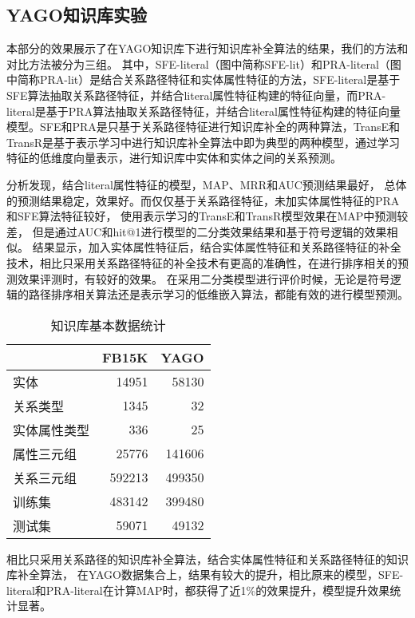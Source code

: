 \subsection{YAGO知识库实验}
\label{cha:exp-literal}
本部分的效果展示了在YAGO知识库下进行知识库补全算法的结果，我们的方法和对比方法被分为三组。
其中，SFE-literal（图中简称SFE-lit）和PRA-literal（图中简称PRA-lit）是结合关系路径特征和实体属性特征的方法，SFE-literal是基于SFE算法抽取关系路径特征，并结合literal属性特征构建的特征向量，而PRA-literal是基于PRA算法抽取关系路径特征，并结合literal属性特征构建的特征向量模型。SFE和PRA是只基于关系路径特征进行知识库补全的两种算法，TransE和TransR是基于表示学习中进行知识库补全算法中即为典型的两种模型，通过学习特征的低维度向量表示，进行知识库中实体和实体之间的关系预测。

分析发现，结合literal属性特征的模型，MAP、MRR和AUC预测结果最好，
总体的预测结果稳定，效果好。而仅仅基于关系路径特征，未加实体属性特征的PRA和SFE算法特征较好，
使用表示学习的TransE和TransR模型效果在MAP中预测较差，
但是通过AUC和hit@1进行模型的二分类效果结果和基于符号逻辑的效果相似。
结果显示，加入实体属性特征后，结合实体属性特征和关系路径特征的补全技术，相比只采用关系路径特征的补全技术有更高的准确性，在进行排序相关的预测效果评测时，有较好的效果。
在采用二分类模型进行评价时候，无论是符号逻辑的路径排序相关算法还是表示学习的低维嵌入算法，都能有效的进行模型预测。

\begin{table}[htbp]
  \centering
  \caption{知识库基本数据统计}
    \begin{tabular}{|l|r|r|}
    \hline
    \textcolor[rgb]{ .141,  .161,  .18}{} & \multicolumn{1}{l|}{FB15K} & \multicolumn{1}{l|}{YAGO} \\
    \hline
    实体    & 14951 & 58130 \\
    \hline
    关系类型  & 1345  & 32 \\
    \hline
    实体属性类型 & 336   & 25 \\
    \hline
    属性三元组 & 25776 & 141606 \\
    \hline
    关系三元组 & 592213 & 499350 \\
    \hline
    训练集   & 483142 & 399480 \\
    \hline
    测试集   & 59071 & 49132 \\
    \hline
    \end{tabular}%
  \label{tab:addlabel-kbcExp-data}%
\end{table}%

相比只采用关系路径的知识库补全算法，结合实体属性特征和关系路径特征的知识库补全算法，
在YAGO数据集合上，结果有较大的提升，相比原来的模型，SFE-literal和PRA-literal在计算MAP时，都获得了近1\%的效果提升，模型提升效果统计显著。

